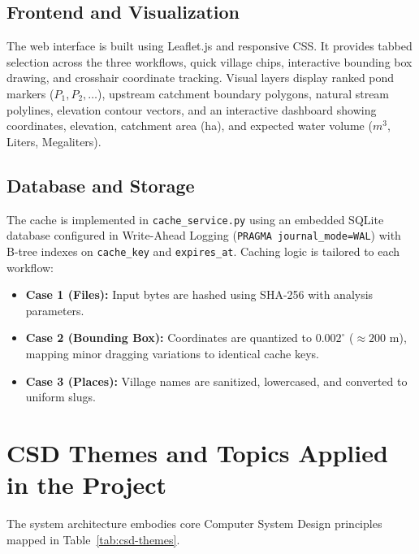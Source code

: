 \documentclass[manuscript,screen,review]{acmart}
\begin{document}
\subsection{Frontend and Visualization}
The web interface is built using Leaflet.js and responsive CSS. It provides tabbed selection across the three workflows, quick village chips, interactive bounding box drawing, and crosshair coordinate tracking. Visual layers display ranked pond markers ($P_1, P_2, \dots$), upstream catchment boundary polygons, natural stream polylines, elevation contour vectors, and an interactive dashboard showing coordinates, elevation, catchment area (ha), and expected water volume ($m^3$, Liters, Megaliters).

\subsection{Database and Storage}
The cache is implemented in \texttt{cache\_service.py} using an embedded SQLite database configured in Write-Ahead Logging (\texttt{PRAGMA journal\_mode=WAL}) with B-tree indexes on \texttt{cache\_key} and \texttt{expires\_at}. Caching logic is tailored to each workflow:
\begin{itemize}
    \item \textbf{Case 1 (Files):} Input bytes are hashed using SHA-256 with analysis parameters.
    \item \textbf{Case 2 (Bounding Box):} Coordinates are quantized to $0.002^\circ$ ($\approx 200\text{ m}$), mapping minor dragging variations to identical cache keys.
    \item \textbf{Case 3 (Places):} Village names are sanitized, lowercased, and converted to uniform slugs.
\end{itemize}

\section{CSD Themes and Topics Applied in the Project}
\label{sec:csd-themes}

The system architecture embodies core Computer System Design principles mapped in Table~\ref{tab:csd-themes}.
\end{document}
